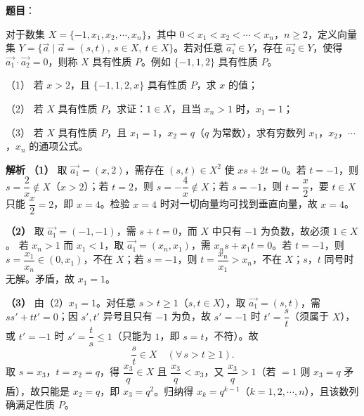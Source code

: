 \begin{answer}

\textbf{题目}：

对于数集 $X=\{-1,x_1,x_2,\cdots,x_n\}$，其中 $0<x_1<x_2<\cdots<x_n$，$n\geqslant2$，定义向量集 $Y=\{\overrightarrow a\mid\overrightarrow a=(s,t),\ s\in X,\ t\in X\}$。若对任意 $\overrightarrow{a_1}\in Y$，存在 $\overrightarrow{a_2}\in Y$，使得 $\overrightarrow{a_1}\cdot\overrightarrow{a_2}=0$，则称 $X$ 具有性质 $P$。例如 $\{-1,1,2\}$ 具有性质 $P$。

（1） 若 $x>2$，且 $\{-1,1,2,x\}$ 具有性质 $P$，求 $x$ 的值；

（2） 若 $X$ 具有性质 $P$，求证：$1\in X$，且当 $x_n>1$ 时，$x_1=1$；

（3） 若 $X$ 具有性质 $P$，且 $x_1=1$，$x_2=q$（$q$ 为常数），求有穷数列 $x_1$，$x_2$，$\cdots$，$x_n$ 的通项公式。


\textbf{解析}
\textbf{（1）} 取 $\overrightarrow{a_1}=(x,2)$，需存在 $(s,t)\in X^2$ 使 $xs+2t=0$。若 $t=-1$，则 $s=\dfrac2x\notin X$（$x>2$）；若 $t=2$，则 $s=-\dfrac4x\notin X$；若 $s=-1$，则 $t=\dfrac x2$，要 $t\in X$ 只能 $\dfrac x2=2$，即 $x=4$。检验 $x=4$ 时对一切向量均可找到垂直向量，故 $x=4$。

\textbf{（2）} 取 $\overrightarrow{a_1}=(-1,-1)$，需 $s+t=0$，而 $X$ 中只有 $-1$ 为负数，故必须 $1\in X$。
若 $x_n>1$ 而 $x_1<1$，取 $\overrightarrow{a_1}=(x_n,x_1)$，需 $x_ns+x_1t=0$。若 $t=-1$，则 $s=\dfrac{x_1}{x_n}\in(0,x_1)$，不在 $X$；若 $s=-1$，则 $t=\dfrac{x_n}{x_1}>x_n$，不在 $X$；$s$，$t$ 同号时无解。矛盾，故 $x_1=1$。

\textbf{（3）} 由（2）$x_1=1$。对任意 $s>t\geqslant1$（$s,t\in X$），取 $\overrightarrow{a_1}=(s,t)$，需 $ss'+tt'=0$；因 $s',t'$ 异号且只有 $-1$ 为负，故 $s'=-1$ 时 $t'=\dfrac st$（须属于 $X$），或 $t'=-1$ 时 $s'=\dfrac ts\leqslant1$（只能为 $1$，即 $s=t$，不符）。故
\nopagebreak[4]
\[\frac st\in X\quad(\forall\,s>t\geqslant1).\]
取 $s=x_3$，$t=x_2=q$，得 $\dfrac{x_3}q\in X$ 且 $\dfrac{x_3}q<x_3$，又 $\dfrac{x_3}q>1$（若 $=1$ 则 $x_3=q$ 矛盾），故只能是 $x_2=q$，即 $x_3=q^2$。归纳得 $x_k=q^{k-1}$（$k=1,2,\cdots,n$），且该数列确满足性质 $P$。




\end{answer}